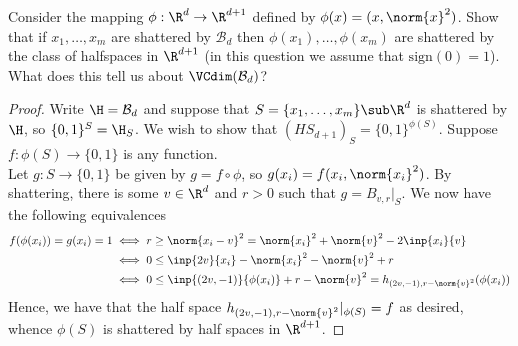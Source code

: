 \documentclass[12pt]{article}
\begin{document}
Consider the mapping $ \phi: \R^{d} \to \R^{d+1} $ defined by $ \phi(x) = (x,\norm{x}^{2}) $. Show that if $ x_{1},\ldots, x_{m} $ are shattered by $ \mathcal{B}_{d} $ then $ \phi(x_{1}),\ldots, \phi(x_{m}) $ are shattered by the class of halfspaces in $ \R^{d+1} $ (in this question we assume that $ \mathrm{sign}(0) = 1 $).  What does this tell us about $ \VCdim(\mathcal{B}_{d}) $?

\begin{proof}
  Write $ \H = \mathcal{B}_{d} $ and suppose that $ S = \{x_{1},\ldots,x_{m}\}\sub \R^{d} $ is shattered by $ \H $, so $ \{0,1\}^{S} = \H_{S} $. We wish to show that $ (HS_{d+1})_{S} = \{0,1\}^{\phi(S)} $. Suppose $ f: \phi(S)\to \{0,1\} $ is any function. \\

  Let $ g:S\to \{0,1\} $ be given by $ g=f\circ \phi $, so $ g(x_{i}) = f(x_{i},\norm{x_{i}}^{2}) $. By shattering, there is some $ v\in \R^{d} $ and $ r>0 $ such that $ g = B_{v,r}\vert_{S} $. We now have the following equivalences
  \begin{align*}
    f(\phi(x_{i})) = g(x_{i}) = 1 &\iff r \geq \norm{x_{i}-v}^{2} = \norm{x_{i}}^{2}+ \norm{v}^{2} -2\inp{x_{i}}{v} \\
    &\iff 0\leq \inp{2v}{x_{i}}-\norm{x_{i}}^{2}-\norm{v}^{2}+r \\
    &\iff 0\leq \inp{(2v,-1)}{\phi(x_{i})} + r-\norm{v}^{2} = h_{(2v,-1),r-\norm{v}^{2}}(\phi(x_{i}))
  \end{align*}
  Hence, we have that the half space  $h_{(2v,-1),r-\norm{v}^{2}}\vert_{\phi(S)} = f$ as desired, whence $ \phi(S) $ is shattered by half spaces in $ \R^{d+1} $. 
\end{proof}



\end{document}
